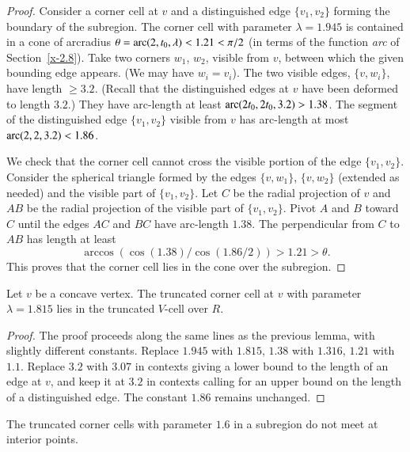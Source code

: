 \begin{proof}
Consider a  corner cell at $v$ and a distinguished edge $\{v_1,v_2\}$
forming the boundary of the subregion. The corner cell with parameter
$\lambda=1.945$ is contained in a cone of arcradius
    $\theta = \operatorname{arc}(2,t_0,\lambda)< 1.21 <\pi/2$
(in terms of the function {\it arc\/} of Section~\ref{x-2.8}). Take two
corners $w_1$, $w_2$, visible from $v$, between which the given bounding
edge appears. (We may have $w_i=v_i$). The two visible edges, $\{v,w_i\}$,
have length $\ge 3.2$. (Recall that the distinguished edges at $v$ have
been deformed to length $3.2$.) They have arc-length at least
$\operatorname{arc}(2t_0,2t_0,3.2)>1.38$. The segment of the distinguished edge
$\{v_1,v_2\}$ visible from $v$ has arc-length at most
$\operatorname{arc}(2,2,3.2)<1.86$.

We check that the corner cell cannot cross the visible portion of
the edge $\{v_1,v_2\}$. Consider the spherical triangle formed by
the edges $\{v,w_1\}$, $\{v,w_2\}$ (extended as needed) and the
visible part of $\{v_1,v_2\}$. Let $C$ be the radial projection of
$v$ and $AB$ be the radial projection of the visible part of
$\{v_1,v_2\}$. Pivot $A$ and $B$ toward $C$ until the edges $AC$ and
$BC$ have arc-length $1.38$.  The perpendicular from $C$ to $AB$
has length at least
    $$\arccos(\cos(1.38)/\cos(1.86/2))>1.21>\theta.$$
This proves that the corner cell lies in the cone over the subregion.
\end{proof}

\begin{lemma}
Let $v$ be a concave vertex. The truncated corner cell at $v$ with
parameter $\lambda=1.815$ lies in the truncated $V$-cell over $R$.
\end{lemma}

\begin{proof}
The proof proceeds along the same lines as the previous lemma, with
slightly different constants. Replace $1.945$ with $1.815$, $1.38$ with
$1.316$, $1.21$ with $1.1$. Replace $3.2$ with $3.07$ in contexts giving
a lower bound to the length of an edge at $v$, and keep it at $3.2$ in
contexts calling for an upper bound on the length of a distinguished
edge. The constant $1.86$ remains unchanged.
\end{proof}

\begin{lemma}
The truncated corner cells with parameter $1.6$ in a subregion do
not meet at interior points.
\end{lemma}

